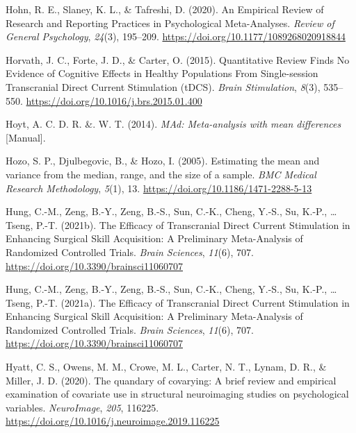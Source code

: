 \documentclass[
  man,floatsintext]{apa6}
\newlength{\cslhangindent}
\newlength{\cslentryspacingunit} %
\newenvironment{CSLReferences}[2] %
 {%
  \setlength{\parindent}{0pt}
  \ifodd #1
  \let\oldpar\par
  \def\par{\hangindent=\cslhangindent\oldpar}
  \fi
  \setlength{\parskip}{#2\cslentryspacingunit}
 }%
 {}
\begin{document}
\begin{CSLReferences}{1}{0}
\leavevmode{}%
Hohn, R. E., Slaney, K. L., \& Tafreshi, D. (2020). An {Empirical Review} of {Research} and {Reporting Practices} in {Psychological Meta-Analyses}. \emph{Review of General Psychology}, \emph{24}(3), 195--209. \url{https://doi.org/10.1177/1089268020918844}

\leavevmode{}%
Horvath, J. C., Forte, J. D., \& Carter, O. (2015). Quantitative {Review Finds No Evidence} of {Cognitive Effects} in {Healthy Populations From Single-session Transcranial Direct Current Stimulation} ({tDCS}). \emph{Brain Stimulation}, \emph{8}(3), 535--550. \url{https://doi.org/10.1016/j.brs.2015.01.400}

\leavevmode{}%
Hoyt, A. C. D. R. \&. W. T. (2014). \emph{{MAd}: {Meta-analysis} with mean differences} {[}Manual{]}.

\leavevmode{}%
Hozo, S. P., Djulbegovic, B., \& Hozo, I. (2005). Estimating the mean and variance from the median, range, and the size of a sample. \emph{BMC Medical Research Methodology}, \emph{5}(1), 13. \url{https://doi.org/10.1186/1471-2288-5-13}

\leavevmode{}%
Hung, C.-M., Zeng, B.-Y., Zeng, B.-S., Sun, C.-K., Cheng, Y.-S., Su, K.-P., \ldots{} Tseng, P.-T. (2021b). The {Efficacy} of {Transcranial Direct Current Stimulation} in {Enhancing Surgical Skill Acquisition}: {A Preliminary Meta-Analysis} of {Randomized Controlled Trials}. \emph{Brain Sciences}, \emph{11}(6), 707. \url{https://doi.org/10.3390/brainsci11060707}

\leavevmode{}%
Hung, C.-M., Zeng, B.-Y., Zeng, B.-S., Sun, C.-K., Cheng, Y.-S., Su, K.-P., \ldots{} Tseng, P.-T. (2021a). The {Efficacy} of {Transcranial Direct Current Stimulation} in {Enhancing Surgical Skill Acquisition}: {A Preliminary Meta-Analysis} of {Randomized Controlled Trials}. \emph{Brain Sciences}, \emph{11}(6), 707. \url{https://doi.org/10.3390/brainsci11060707}

\leavevmode{}%
Hyatt, C. S., Owens, M. M., Crowe, M. L., Carter, N. T., Lynam, D. R., \& Miller, J. D. (2020). The quandary of covarying: {A} brief review and empirical examination of covariate use in structural neuroimaging studies on psychological variables. \emph{NeuroImage}, \emph{205}, 116225. \url{https://doi.org/10.1016/j.neuroimage.2019.116225}


\end{CSLReferences}
\end{document}
